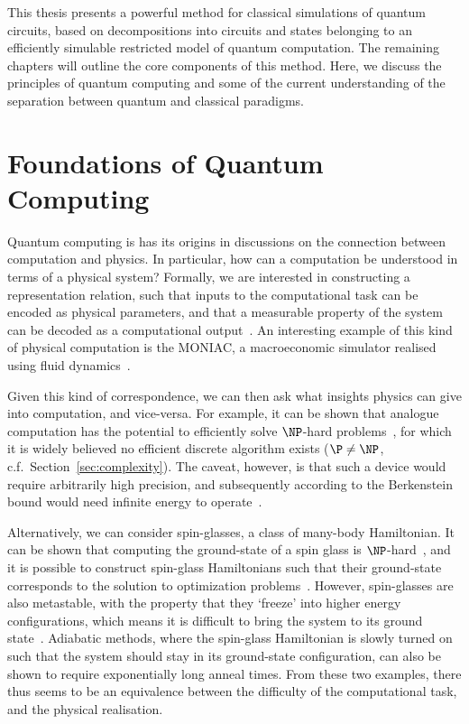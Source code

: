 This thesis presents a powerful method for classical simulations of quantum circuits, based on decompositions into circuits and states belonging to an efficiently simulable restricted model of quantum computation. The remaining chapters will outline the core components of this method. Here, we discuss the principles of quantum computing and some of the current understanding of the separation between quantum and classical paradigms.
\section{Foundations of Quantum Computing}
Quantum computing is has its origins in discussions on the connection between computation and physics. In particular, how can a computation be understood in terms of a physical system? Formally, we are interested in constructing a representation relation, such that inputs to the computational task can be encoded as physical parameters, and that a measurable property of the system can be decoded as a computational output~\cite{Horsman2014}. An interesting example of this kind of physical computation is the MONIAC, a macroeconomic simulator realised using fluid dynamics~\cite{Bissell2007}.\par
Given this kind of correspondence, we can then ask what insights physics can give into computation, and vice-versa. For example, it can be shown that analogue computation has the potential to efficiently solve $\NP$-hard problems~\cite{Schonhage1979}, for which it is widely believed no efficient discrete algorithm exists ($\P \neq \NP$, c.f.\ Section~\ref{sec:complexity}). The caveat, however, is that such a device would require arbitrarily high precision, and subsequently according to the Berkenstein bound would need infinite energy to operate~\cite{Aaronson2005}.\par
Alternatively, we can consider spin-glasses, a class of many-body Hamiltonian. It can be shown that computing the ground-state of a spin glass is $\NP$-hard~\cite{Barahona1982}, and it is possible to construct spin-glass Hamiltonians such that their ground-state corresponds to the solution to optimization problems~\cite{Choi2010,Lucas2014}. However, spin-glasses are also metastable, with the property that they `freeze' into higher energy configurations, which means it is difficult to bring the system to its ground state~\cite{Edwards1975}. Adiabatic methods, where the spin-glass Hamiltonian is slowly turned on such that the system should stay in its ground-state configuration, can also be shown to require exponentially long anneal times. From these two examples, there thus seems to be an equivalence between the difficulty of the computational task, and the physical realisation.\par
